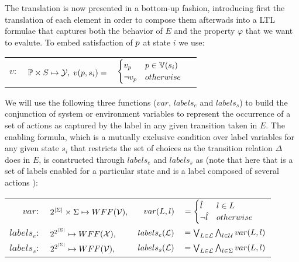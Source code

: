 The translation is now presented in a bottom-up fashion, introducing first the translation of each element in order to compose them afterwads into a LTL formulae that captures both the behavior of $E$ and the property $\varphi$ that we want to evalute. To embed satisfaction of $p$ at state $i$ we use:
\begin{center}
	\begin{tabular}{r r r l}
$v:$ & $\mathbb{P} \times S \mapsto {\ensuremath{\mathcal{Y}}},$
$
v(p,s_i) = $ & $\begin{cases}
v_{p} & p \in \mathbb{V}(s_i) \\
\neg v_{p} & otherwise
\end{cases}
$
\end{tabular}
\end{center}
We will use the following three functions ($var$, $labels_e$ and $labels_s$) to build the conjunction of system or environment variables to represent the occurrence of a set of actions as captured by the label in any given transition taken in $E$.
The enabling formula, which is a mutually exclusive condition over label variables for any given state $s_i$ that restricts the set of choices as the transition relation $\Delta$ does in $E$, is constructed through $labels_e$ and $labels_s$ as (note that here that  is a set of labels \actionLabel enabled for a particular state and \actionLabel is a label composed of several actions \action ):

\begin{center}
	\begin{tabular}{r l r l}
		$var:$&$2^{|\Sigma|}\times \Sigma \mapsto WFF({\mathcal{V}}),$ &
		$
		var(L, l)$&$= \begin{cases}
		\hat{l}_{} & l \in L \\
		\neg \hat{l}_{} & otherwise
		\end{cases}
		$\\
		$labels_e:$&$2^{2^{|\Sigma|}}\mapsto WFF({\mathcal{X}}),$ &
		$labels_e(\mathcal{L})$&$= \bigvee_{L \in \mathcal{L}}\bigwedge_{l \in \mathcal{U}}var(L, l)$\\
		$labels_s:$&$2^{2^{|\Sigma|}}\mapsto  WFF({\mathcal{V}}),$ &
		$labels_s(\mathcal{L})$&$= \bigvee_{L \in \mathcal{L}}\bigwedge_{l \in \Sigma}var(L, l)$\\
	\end{tabular}
\end{center}


